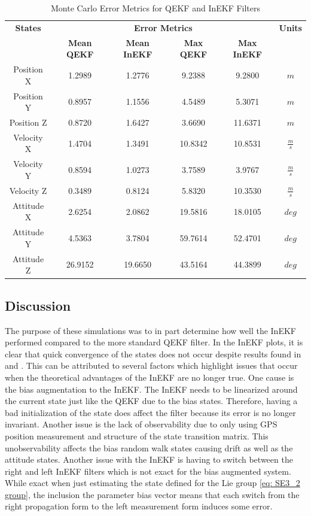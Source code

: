 \begin{table}[H]
\centering
\begin{tabular}{|c|c|c|c|c|c|}
    \hline
    \textbf{States} & \multicolumn{4}{|c|}{\textbf{Error Metrics}} & \textbf{Units} \\
    \cline{2-5}
    & \textbf{Mean QEKF} & \textbf{Mean InEKF} & \textbf{Max QEKF} & \textbf{Max InEKF} & \\
    \hline
    Position X & 1.2989 & 1.2776 & 9.2388 & 9.2800 & $m$ \\
    Position Y & 0.8957 & 1.1556 & 4.5489 & 5.3071 & $m$ \\
    Position Z & 0.8720 & 1.6427 & 3.6690 & 11.6371 & $m$ \\
    \hline
    Velocity X & 1.4704 & 1.3491 & 10.8342 & 10.8531 & $\frac{m}{s}$ \\
    Velocity Y & 0.8594 & 1.0273 & 3.7589 & 3.9767 & $\frac{m}{s}$ \\
    Velocity Z & 0.3489 & 0.8124 & 5.8320 & 10.3530 & $\frac{m}{s}$ \\
    \hline
    Attitude X & 2.6254 & 2.0862 & 19.5816 & 18.0105 & $deg$ \\
    Attitude Y & 4.5363 & 3.7804 & 59.7614 & 52.4701 & $deg$ \\
    Attitude Z & 26.9152 & 19.6650 & 43.5164 & 44.3899 & $deg$ \\
    \hline
\end{tabular}
\caption{Monte Carlo Error Metrics for QEKF and InEKF Filters}
\label{tab: error metrics}
\end{table}


\subsection{Discussion}
The purpose of these simulations was to in part determine how well the InEKF performed compared to the more standard QEKF filter. In the InEKF plots, it is clear that quick convergence of the states does not occur despite results found in \cite{Contact-Aided_Invarant_EKF} and \cite{9444664}. This can be attributed to several factors which highlight issues that occur when the theoretical advantages of the InEKF are no longer true. One cause is the bias augmentation to the InEKF. The InEKF needs to be linearized around the current state just like the QEKF due to the bias states. Therefore, having a bad initialization of the state does affect the filter because its error is no longer invariant. Another issue is the lack of observability due to only using GPS position measurement and structure of the state transition matrix. This unobservability affects the bias random walk states causing drift as well as the attitude states. Another issue with the InEKF is having to switch between the right and left InEKF filters which is not exact for the bias augmented system. While exact when just estimating the state defined for the Lie group \eqref{eq: SE3_2 group}, the inclusion the parameter bias vector means that each switch from the right propagation form to the left measurement form induces some error. 

